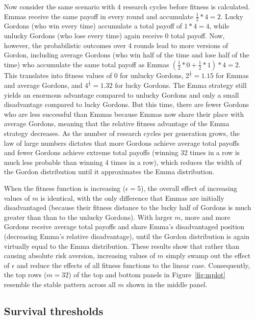 \documentclass[british,,man,floatsintext]{apa6}
\begin{document}
Now consider the same scenario with 4 research cycles before fitness is calculated.
Emmas receive the same payoff in every round and accumulate \(\frac{1}{2} * 4 = 2\).
Lucky Gordons (who win every time) accumulate a total payoff of \(1*4 = 4\), while unlucky Gordons (who lose every time) again receive 0 total payoff.
Now, however, the probabilistic outcomes over 4 rounds lead to more versions of Gordon, including average Gordons (who win half of the time and lose half of the time) who accumulate the same total payoff as Emmas \((\frac{1}{2}*0 + \frac{1}{2}*1)*4 = 2\).
This translates into fitness values of 0 for unlucky Gordons, \(2^{\frac{1}{5}} = 1.15\) for Emmas and average Gordons, and \(4^{\frac{1}{5}} = 1.32\) for lucky Gordons.
The Emma strategy still yields an enormous advantage compared to unlucky Gordons and only a small disadvantage compared to lucky Gordons.
But this time, there are fewer Gordons who are less successful than Emmas because Emmas now share their place with average Gordons, meaning that the relative fitness advantage of the Emma strategy decreases.
As the number of research cycles per generation grows, the law of large numbers dictates that more Gordons achieve average total payoffs and fewer Gordons achieve extreme total payoffs (winning 32 times in a row is much less probable than winning 4 times in a row), which reduces the width of the Gordon distribution until it approximates the Emma distribution.

When the fitness function is increasing (\(\epsilon = 5\)), the overall effect of increasing values of \(m\) is identical, with the only difference that Emmas are initially disadvantaged (because their fitness distance to the lucky half of Gordons is much greater than than to the unlucky Gordons).
With larger \(m\), more and more Gordons receive average total payoffs and share Emma's disadvantaged position (decreasing Emma's relative disadvantage), until the Gordon distribution is again virtually equal to the Emma distribution.
These results show that rather than causing absolute risk aversion, increasing values of \(m\) simply swamp out the effect of \(\epsilon\) and reduce the effects of all fitness functions to the linear case.
Consequently, the top rows (\(m = 32\)) of the top and bottom panels in Figure~\ref{fig:mplot} resemble the stable pattern across all \(m\) shown in the middle panel.

\hypertarget{survival-thresholds}{%
\subsection{Survival thresholds}\label{survival-thresholds}}
\end{document}
